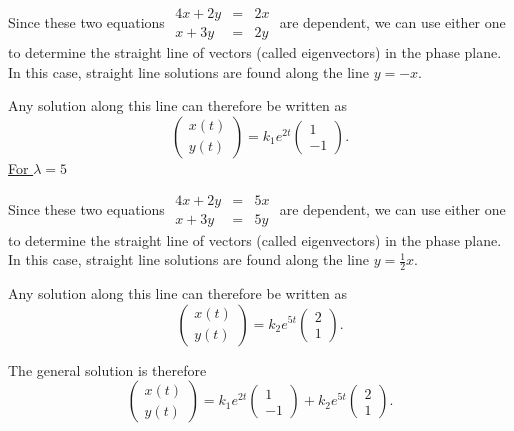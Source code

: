 Since these two equations $\begin{matrix} 4x+2y &=& 2 x \\x+3y  &=& 2 y  \end{matrix}$ are dependent, we can use either one to determine the straight line of vectors (called eigenvectors) in the phase plane. In this case, straight line solutions are found along the line $y = -x$. 

Any solution along this line can therefore be written as  
\[ \begin{pmatrix}x(t)\\y(t)\end{pmatrix}=k_1e^{2t}\begin{pmatrix}1\\-1\end{pmatrix}.
\]
\underline{For   $\lambda= 5$}

Since these two equations $\begin{matrix} 4x+2y &=& 5 x \\x+3y  &=& 5 y  \end{matrix}$ are dependent, we can use either one to determine the straight line of vectors (called eigenvectors) in the phase plane. In this case, straight line solutions are found along the line  $y=\frac{1}{2}x$.

Any solution along this line can therefore be written as  
\[ \begin{pmatrix}x(t)\\y(t)\end{pmatrix}=k_2e^{5t}\begin{pmatrix}2\\1\end{pmatrix}.
\]


The general solution is therefore
\[
\begin{pmatrix}x(t)\\y(t)\end{pmatrix}=k_1e^{2t}\begin{pmatrix}1\\-1\end{pmatrix}+k_2e^{5t}\begin{pmatrix}2\\1\end{pmatrix}.
\]

